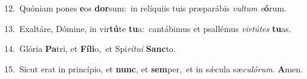 {\numbfont\textcolor{\numbcolor}{12.}}~Quóniam pones \textbf{e}\-os \textbf{dor}\-sum:~\star in relíquiis tuis præparábis \textit{vul}\-\textit{tum} \textit{e}\-\textbf{ó}rum.\par
{\numbfont\textcolor{\numbcolor}{13.}}~Exaltáre, Dómine, in vir\-\textbf{tú}\-te \textbf{tu}\-a:~\star cantábimus et psallémus \textit{vir}\-\textit{tú}\textit{tes} \textbf{tu}\-as.\par
{\numbfont\textcolor{\numbcolor}{14.}}~Glória \textbf{Pa}\-tri, et \textbf{Fí}\-\textbf{li}o,~\star et Spi\-\textit{rí}\-\textit{tu}\textit{i} \textbf{Sanc}\-to.\par
{\numbfont\textcolor{\numbcolor}{15.}}~Sicut erat in princípio, et \textbf{nunc}\-, et \textbf{sem}\-per,~\star et in sǽcula sæ\-\textit{cu}\-\textit{ló}\textit{rum}. \textbf{A}\-men.\par

